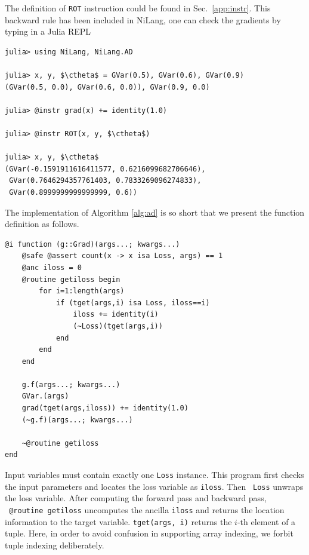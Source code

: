\documentclass[aps,twocolumn,longbibliography,english,superscriptaddress]{revtex4-1}
\newcommand{\<}{\langle}
\renewcommand{\>}{\rangle}
\newcommand{\ctheta}{{\color{jlbase}{\rm \theta}}}
\newcommand{\Sec}[1]{Sec.~\ref{#1}}
\theoremstyle{definition}\newtheorem{definition}{\textit{Definition}}
\begin{document}
The definition of \texttt{ROT} instruction could be found in \Sec{app:instr}. This backward rule has been included in NiLang, one can check the gradients by typing in a Julia REPL

\begin{minipage}{.44\textwidth}
    \begin{lstlisting}[mathescape=true]
julia> using NiLang, NiLang.AD

julia> x, y, $\ctheta$ = GVar(0.5), GVar(0.6), GVar(0.9)
(GVar(0.5, 0.0), GVar(0.6, 0.0)), GVar(0.9, 0.0)

julia> @instr grad(x) += identity(1.0)

julia> @instr ROT(x, y, $\ctheta$)

julia> x, y, $\ctheta$
(GVar(-0.1591911616411577, 0.6216099682706646),
 GVar(0.7646294357761403, 0.7833269096274833),
 GVar(0.8999999999999999, 0.6))
\end{lstlisting}
\end{minipage}


The implementation of Algorithm \ref{alg:ad} is so short that we present the function definition as follows.

\begin{minipage}{.44\textwidth}
\begin{lstlisting}
@i function (g::Grad)(args...; kwargs...)
    @safe @assert count(x -> x isa Loss, args) == 1
    @anc iloss = 0
    @routine getiloss begin
        for i=1:length(args)
            if (tget(args,i) isa Loss, iloss==i)
                iloss += identity(i)
                (~Loss)(tget(args,i))
            end
        end
    end

    g.f(args...; kwargs...)
    GVar.(args)
    grad(tget(args,iloss)) += identity(1.0)
    (~g.f)(args...; kwargs...)

    ~@routine getiloss
end
\end{lstlisting}
\end{minipage}

Input variables must contain exactly one \texttt{Loss} instance.
This program first checks the input parameters and locates the loss variable as \texttt{iloss}. Then \texttt{~Loss} unwraps the loss variable.
After computing the forward pass and backward pass, \texttt{~@routine getiloss} uncomputes the ancilla \texttt{iloss} and returns the location information to the target variable.
\texttt{tget(args, i)} returns the $i$-th element of a tuple.
Here, in order to avoid confusion in supporting array indexing, we forbit tuple indexing deliberately.
\end{document}
